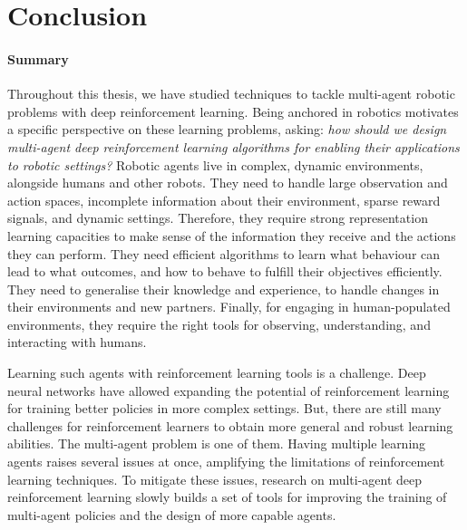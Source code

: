
\chapter{Conclusion}

\label{ChapterConclusion} 



\subsubsection{Summary}

Throughout this thesis, we have studied techniques to tackle multi-agent robotic problems with deep reinforcement learning. Being anchored in robotics motivates a specific perspective on these learning problems, asking: \textit{how should we design multi-agent deep reinforcement learning algorithms for enabling their applications to robotic settings?} Robotic agents live in complex, dynamic environments, alongside humans and other robots. They need to handle large observation and action spaces, incomplete information about their environment, sparse reward signals, and dynamic settings. Therefore, they require strong representation learning capacities to make sense of the information they receive and the actions they can perform. They need efficient algorithms to learn what behaviour can lead to what outcomes, and how to behave to fulfill their objectives efficiently. They need to generalise their knowledge and experience, to handle changes in their environments and new partners. Finally, for engaging in human-populated environments, they require the right tools for observing, understanding, and interacting with humans. 

Learning such agents with reinforcement learning tools is a challenge. Deep neural networks have allowed expanding the potential of reinforcement learning for training better policies in more complex settings. But, there are still many challenges for reinforcement learners to obtain more general and robust learning abilities. The multi-agent problem is one of them. Having multiple learning agents raises several issues at once, amplifying the limitations of reinforcement learning techniques. To mitigate these issues, research on multi-agent deep reinforcement learning slowly builds a set of tools for improving the training of multi-agent policies and the design of more capable agents. 

